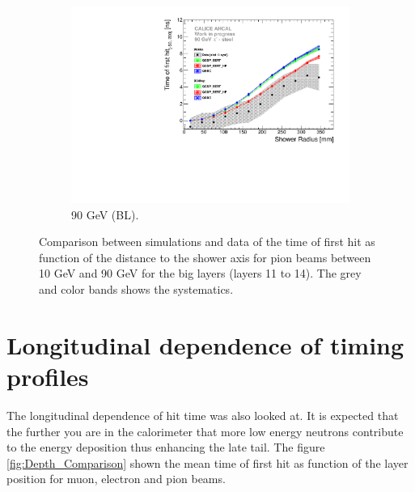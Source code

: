 \begin{figure}[htbp!]
\begin{subfigure}[t]{0.5\textwidth}
		\includegraphics[width=1\textwidth]{../Thesis_Plots/Timing/Pions/Plots/ComparisonToSim/Time_Radius_90GeV_BL.pdf}
		\caption{90 GeV (BL).} \label{fig:Radius_BL_SimData_90GeV}
	\end{subfigure}
	\caption{Comparison between simulations and data of the time of first hit as function of the distance to the shower axis for pion beams between 10 GeV and 90 GeV for the big layers (layers 11 to 14). The grey and color bands shows the systematics.}
	\label{fig:Radius_BL_SimData_Comparison}
\end{figure}

\section{Longitudinal dependence of timing profiles}

The longitudinal dependence of hit time was also looked at. It is expected that the further you are in the calorimeter that more low energy neutrons contribute to the energy deposition thus enhancing the late tail. The figure \ref{fig:Depth_Comparison} shown the mean time of first hit as function of the layer position for muon, electron and pion beams.

